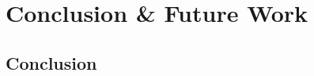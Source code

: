\chapter{Conclusion \& Future Work}

\section{Conclusion}
\begin{comment}
\begin{description}[leftmargin=!,labelwidth=\widthof{RQ:}]
\item[\textbf{RG:}] Design and develop an end-to-end pipeline for generating NeRFs, leveraging vehicle-captured video sequences and corresponding camera poses with varying degrees of accuracy.
\end{description}
\end{comment}

\begin{comment}
- What has been done in the thesis?
- Main topics
- What were the results?

The data has been vehicle-captured, starting in a controllable, virtual environment CARLA, and later expanded to real vehicle-data.

This thesis focused on designing and developing an end-to-end pipeline for capturing data from a scene and using the captured data to generate a NeRF representing the same scene. After being developed, the end-to-end pipeline was first used with synthetic data captured in a controllable, virtual environment - CARLA - in order to create a baseline. The experiments conducted to create the baseline highlights the importance of considering the camera setup, segment length or scene size, dataset size, image size, and vehicle speed. The baseline was subsequently used to conduct further experiments. The findings from the subsequent experiments conclude that despite noise, optimized camera poses yield superior renderings, especially in shorter segments, while non-optimized poses excel only with perfect camera poses. Additionally, COLMAP pre-processing significantly outperforms joint optimization, especially with substantial noise, making it a worthy consideration despite the initial time commitment. Another development was the implementation of a naive large scale NeRF approach. The results from experiments conducted on it highlights its efficacy on multiple scenes, producing sharper details and an overall enhancement in the visual quality.

After implementing a dataparser for the real data to be piped into the same pipeline, multiple experiments were conducted, comparing the results with the results form the synthetic data. Despite having a working pipeline, the results from the vehicle-captured real data wasn't great, and multiple limitations were put forward as to why.
\end{comment}

